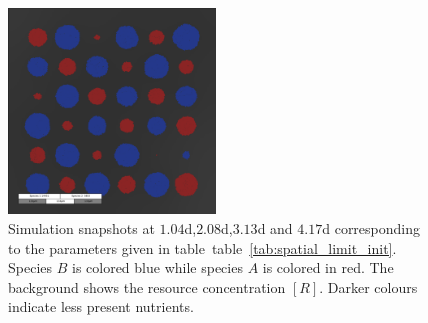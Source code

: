 \documentclass[10pt,A4paper]{article}
\numberwithin{equation}{section}
\begin{document}
\begin{figure}
    \includegraphics[width=0.49\textwidth]{Figures/abm-homogenous/snapshot_00024000.png}%
    \caption{
        Simulation snapshots at $1.04$\unit{\day},$2.08$\unit{\day},$3.13$\unit{\day} and $4.17$\unit{\day} corresponding to the parameters given in table~table~\ref{tab:spatial_limit_init}.
        Species $B$ is colored blue while species $A$ is colored in red.
        The background shows the resource concentration $[R]$.
        Darker colours indicate less present nutrients.
    }
    \label{fig:spatial-snapshots}
\end{figure}
%
%
\end{document}
